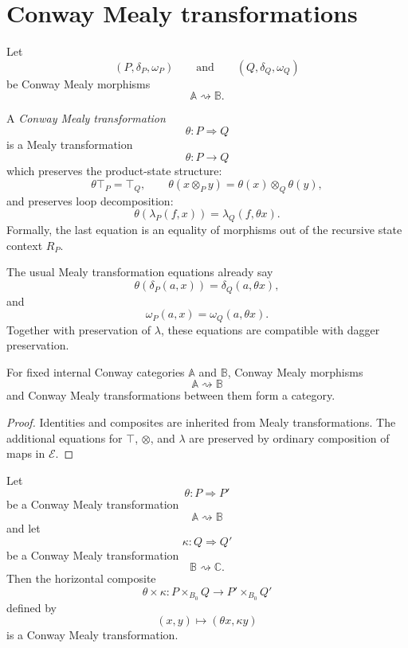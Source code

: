 \section{Conway Mealy transformations}
\label{sec:conway-mealy-transformations}

Let
\[
(P,\delta_P,\omega_P)
\qquad\text{and}\qquad
(Q,\delta_Q,\omega_Q)
\]
be Conway Mealy morphisms
\[
\mathbb A\rightsquigarrow\mathbb B.
\]

\begin{definition}
\label{def:conway-mealy-transformation}
A \emph{Conway Mealy transformation}
\[
\theta:P\Rightarrow Q
\]
is a Mealy transformation
\[
\theta:P\to Q
\]
which preserves the product-state structure:
\[
\theta\top_P=\top_Q,
\qquad
\theta(x\otimes_P y)=\theta(x)\otimes_Q\theta(y),
\]
and preserves loop decomposition:
\[
\theta(\lambda_P(f,x))
=
\lambda_Q(f,\theta x).
\]
Formally, the last equation is an equality of morphisms out of the recursive
state context \(R_P\).
\end{definition}

The usual Mealy transformation equations already say
\[
\theta(\delta_P(a,x))
=
\delta_Q(a,\theta x),
\]
and
\[
\omega_P(a,x)
=
\omega_Q(a,\theta x).
\]
Together with preservation of \(\lambda\), these equations are compatible
with dagger preservation.

\begin{proposition}
\label{prop:conway-mealy-transformations-category}
For fixed internal Conway categories \(\mathbb A\) and \(\mathbb B\), Conway
Mealy morphisms
\[
\mathbb A\rightsquigarrow\mathbb B
\]
and Conway Mealy transformations between them form a category.
\end{proposition}

\begin{proof}
Identities and composites are inherited from Mealy transformations.  The
additional equations for \(\top\), \(\otimes\), and \(\lambda\) are preserved
by ordinary composition of maps in \(\mathcal E\).
\end{proof}

\begin{proposition}
\label{prop:horizontal-composition-conway-mealy-transformations}
Let
\[
\theta:P\Rightarrow P'
\]
be a Conway Mealy transformation
\[
\mathbb A\rightsquigarrow\mathbb B
\]
and let
\[
\kappa:Q\Rightarrow Q'
\]
be a Conway Mealy transformation
\[
\mathbb B\rightsquigarrow\mathbb C.
\]
Then the horizontal composite
\[
\theta\times\kappa:
P\times_{B_0}Q
\to
P'\times_{B_0}Q'
\]
defined by
\[
(x,y)\longmapsto(\theta x,\kappa y)
\]
is a Conway Mealy transformation.
\end{proposition}

